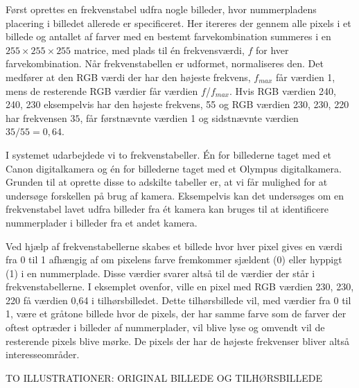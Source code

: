Først oprettes en frekvenstabel udfra nogle billeder, hvor nummerpladens placering i billedet allerede er specificeret. Her itereres der gennem alle pixels i et billede og antallet af farver med en bestemt farvekombination summeres i en $255 \times 255 \times 255$ matrice, med plads til én frekvensværdi, $f$ for hver farvekombination. Når frekvenstabellen er udformet, normaliseres den. Det medfører at den RGB værdi der har den højeste frekvens, $f_{max}$ får værdien 1, mens de resterende RGB værdier får værdien $f$/$f_{max}$. Hvis RGB værdien 240, 240, 230 eksempelvis har den højeste frekvens, 55 og RGB værdien 230, 230, 220 har frekvensen $35$, får førstnævnte værdien 1 og sidstnævnte værdien $35/55 = 0,64$.


I systemet udarbejdede vi to frekvenstabeller. Én for billederne taget med et Canon digitalkamera og én for billederne taget med et Olympus digitalkamera. Grunden til at oprette disse to adskilte tabeller er, at vi får mulighed for at undersøge forskellen på brug af kamera. Eksempelvis kan det undersøges om en frekvenstabel lavet udfra billeder fra ét kamera kan bruges til at identificere nummerplader i billeder fra et andet kamera.



Ved hjælp af frekvenstabellerne skabes et billede hvor hver pixel gives en værdi fra 0 til 1 afhængig af om pixelens farve fremkommer sjældent (0) eller hyppigt (1) i en nummerplade. Disse værdier svarer altså til de værdier der står i frekvenstabellerne. I eksemplet ovenfor, ville en pixel med RGB værdien 230, 230, 220 få værdien 0,64 i tilhørsbilledet. Dette tilhørsbillede vil, med værdier fra 0 til 1, være et gråtone billede hvor de pixels, der har samme farve som de farver der oftest optræder i billeder af nummerplader, vil blive lyse og omvendt vil de resterende pixels blive mørke. De pixels der har de højeste frekvenser bliver altså interesseområder.

TO ILLUSTRATIONER: ORIGINAL BILLEDE OG TILHØRSBILLEDE



